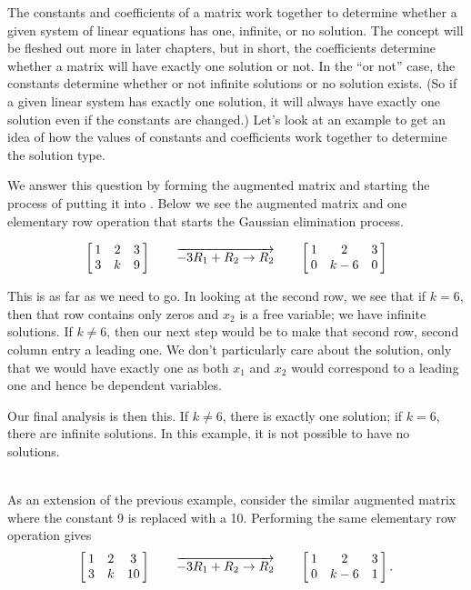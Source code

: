 The constants and coefficients of a matrix work together to determine whether a given system of linear equations has one, infinite, or no solution. The concept will be fleshed out more in later chapters, but in short, the coefficients determine whether a matrix will have exactly one solution or not. In the ``or not'' case, the constants determine whether or not infinite solutions or no solution exists. (So if a given linear system has exactly one solution, it will always have exactly one solution even if the constants are changed.) Let's look at an example to get an idea of how the values of constants and coefficients work together to determine the solution type.\\

{We answer this question by forming the augmented matrix and starting the process of putting it into \rref. Below we see the augmented matrix and one elementary row operation that starts the Gaussian elimination process.

$$\bmx{ccc} 1&2&3\\3&k&9\emx \qquad \overrightarrow{-3R_1+R_2\rightarrow R_2} \qquad \bmx{ccc} 1&2&3\\0&k-6&0\emx$$

This is as far as we need to go. In looking at the second row, we see that if $k=6$, then that row contains only zeros and $x_2$ is a free variable; we have infinite solutions. If $k\neq 6$, then our next step would be to make that second row, second column entry a leading one. We don't particularly care about the solution, only that we would have exactly one as both $x_1$ and $x_2$ would correspond to a leading one and hence be dependent variables.

Our final analysis is then this. If $k\neq 6$, there is exactly one solution; if $k=6$, there are infinite solutions. In this example, it is not possible to have no solutions.}\\

As an extension of the previous example, consider the similar augmented matrix where the constant 9 is replaced with a 10. Performing the same elementary row operation gives
$$\bmx{ccc} 1&2&3\\3&k&10\emx \qquad \overrightarrow{-3R_1+R_2\rightarrow R_2} \qquad \bmx{ccc} 1&2&3\\0&k-6&1\emx.$$

